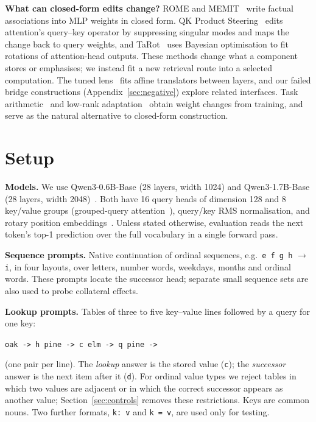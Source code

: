 \documentclass[11pt]{article}
\begin{document}
\textbf{What can closed-form edits change?} ROME and MEMIT~\cite{meng2022rome,meng2023memit} write factual associations into MLP weights in closed form. QK Product Steering~\cite{tiwari2026qk} edits attention's query--key operator by suppressing singular modes and maps the change back to query weights, and TaRot~\cite{mbe2024} uses Bayesian optimisation to fit rotations of attention-head outputs. These methods change what a component stores or emphasises; we instead fit a new retrieval route into a selected computation. The tuned lens~\cite{belrose2023tuned} fits affine translators between layers, and our failed bridge constructions (Appendix~\ref{sec:negative}) explore related interfaces. Task arithmetic~\cite{ilharco2023task} and low-rank adaptation~\cite{hu2022lora} obtain weight changes from training, and serve as the natural alternative to closed-form construction.

\section{Setup}

\textbf{Models.} We use Qwen3-0.6B-Base (28 layers, width 1024) and Qwen3-1.7B-Base (28 layers, width 2048)~\cite{qwen3}. Both have 16 query heads of dimension 128 and 8 key/value groups (grouped-query attention~\cite{ainslie2023gqa}), query/key RMS normalisation, and rotary position embeddings~\cite{su2021roformer}. Unless stated otherwise, evaluation reads the next token's top-1 prediction over the full vocabulary in a single forward pass.

\textbf{Sequence prompts.} Native continuation of ordinal sequences, e.g.\ \texttt{e f g h} $\to$ \texttt{i}, in four layouts, over letters, number words, weekdays, months and ordinal words. These prompts locate the successor head; separate small sequence sets are also used to probe collateral effects.

\textbf{Lookup prompts.} Tables of three to five key--value lines followed by a query for one key:
\begin{center}\texttt{oak -> h \quad pine -> c \quad elm -> q \quad pine ->}\end{center}
(one pair per line). The \emph{lookup} answer is the stored value (\texttt{c}); the \emph{successor} answer is the next item after it (\texttt{d}). For ordinal value types we reject tables in which two values are adjacent or in which the correct successor appears as another value; Section~\ref{sec:controls} removes these restrictions. Keys are common nouns. Two further formats, \texttt{k:~v} and \texttt{k~=~v}, are used only for testing.
\end{document}
